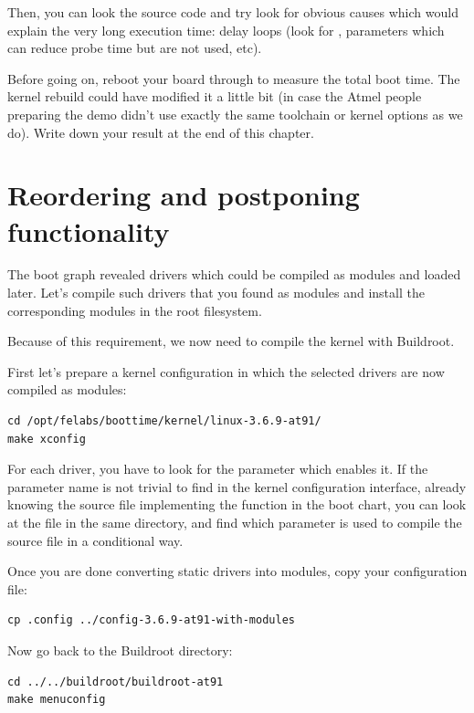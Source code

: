 Then, you can look the source code and try look for obvious causes which
would explain the very long execution time: delay loops (look for
, parameters which can reduce probe time but are not used,
etc).

Before going on, reboot your board through  to measure
the total boot time. The kernel rebuild could have modified it a little
bit (in case the Atmel people preparing the demo didn't use exactly the same toolchain
or kernel options as we do). Write down your result at the end of this
chapter.

\section{Reordering and postponing functionality}

The boot graph revealed drivers which could be compiled as modules
and loaded later.  Let's compile such drivers that you found as modules
and install the corresponding modules in the root filesystem.

Because of this requirement, we now need to compile the kernel with
Buildroot.

First let's prepare a kernel configuration in which the selected
drivers are now compiled as modules:

\begin{verbatim}
cd /opt/felabs/boottime/kernel/linux-3.6.9-at91/
make xconfig
\end{verbatim}

For each driver, you have to look for the parameter which enables it.
If the parameter name is not trivial to find in the kernel configuration
interface, already knowing the source file implementing
the function in the boot chart, you can look at
the  file in the same directory, and find which
parameter is used to compile the source file in a conditional way.

Once you are done converting static drivers into modules,
copy your configuration file:

\begin{verbatim}
cp .config ../config-3.6.9-at91-with-modules
\end{verbatim}

Now go back to the Buildroot directory:

\begin{verbatim}
cd ../../buildroot/buildroot-at91
make menuconfig
\end{verbatim}

